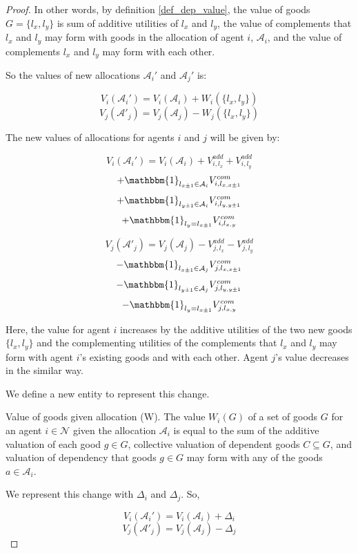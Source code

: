 \begin{proof}
In other words, by definition \ref{def_dep_value}, the value of goods $G = \{l_x, l_y\}$ is sum of additive utilities of $l_x$ and $l_y$, the value of complements that $l_x$ and $l_y$ may form with goods in the allocation of agent $i$, $\mathcal{A}_i$, and the value of complements $l_x$ and $l_y$ may form with each other.

So the values of new allocations $\mathcal{A}_i'$ and $\mathcal{A}_j'$ is:

\[
    V_i(\mathcal{A}_i') = V_i(\mathcal{A}_i) + W_i(\{l_x, l_y\})
\]
\[
    V_j(\mathcal{A}'_j) = V_j(\mathcal{A}_j) - W_j(\{l_x, l_y\})
\]

The new values of allocations for agents $i$ and $j$ will be given by:

\[
    V_i(\mathcal{A}_i') = V_i(\mathcal{A}_i) + V_{i,l_x}^{add} + V_{i,l_y}^{add}
\]\[
    + \mathbbm{1}_{l_{x \pm 1} \in \mathcal{A}_i}V_{i,l_{x,x\pm 1}}^{com}
\]\[
    + \mathbbm{1}_{l_{y \pm 1} \in \mathcal{A}_i}V_{i,l_{y,y\pm 1}}^{com}
\]\[
    + \mathbbm{1}_{l_y = l_{x \pm 1}}V_{i,l_{x,y}}^{com}
\]

\[
    V_j(\mathcal{A}'_j) = V_j(\mathcal{A}_j) - V_{j,l_x}^{add} - V_{j,l_y}^{add}
\]\[
    - \mathbbm{1}_{l_{x \pm 1} \in \mathcal{A}_j}V_{j,l_{x,x\pm 1}}^{com}
\]\[
    - \mathbbm{1}_{l_{y \pm 1} \in \mathcal{A}_j}V_{j,l_{y,y\pm 1}}^{com}
\]\[
    - \mathbbm{1}_{l_y = l_{x \pm 1}}V_{j,l_{x,y}}^{com}
\]

Here, the value for agent $i$ increases by the additive utilities of the two new goods $\{l_x, l_y\}$ and the complementing utilities of the complements that $l_x$ and $l_y$ may form with agent $i$'s existing goods and with each other. Agent $j$'s value decreases in the similar way. 

We define a new entity to represent this change.

\begin{definition}{Value of goods given allocation (W).}
\label{def_dep_value}
The value $W_i(G)$ of a set of goods $G$ for an agent $i \in \mathcal{N}$ given the allocation $\mathcal{A}_i$ is equal to the sum of the additive valuation of each good $g \in G$, collective valuation of dependent goods $C \subseteq G$, and valuation of dependency that goods $g \in G$ may form with any of the goods $a \in \mathcal{A}_i$.
\end{definition}


We represent this change with $\Delta_i$ and $\Delta_j$. So,

\[
    V_i(\mathcal{A}_i') = V_i(\mathcal{A}_i) + \Delta_i
\]
\[
    V_j(\mathcal{A}'_j) = V_j(\mathcal{A}_j) - \Delta_j
\]


\end{proof}
